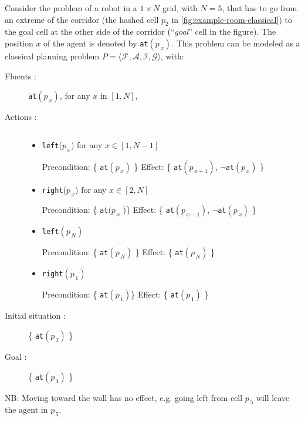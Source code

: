 \begin{example}
\label{ex:example-classical}
Consider the problem of a robot in a $1\times N$ grid, with
$N=5$, that has to go from an extreme of the corridor (the hashed cell $p_2$ in \autoref{fig:example-room-classical})
 to the goal cell at the other side of the corridor (``\emph{goal}'' cell in the figure). The position $x$ of the agent is
denoted by \texttt{at}$(p_{\,x})$.
%
 This problem can be modeled
as a classical planning problem $P = \langle \mathcal{F, A, I, G} \rangle$, with:
\begin{description}
 \item [Fluents \fluents:] \texttt{at}$(p_{\,x})$, %
   for any $x$ in  $[1, N]$,
\item [Actions \acts:]$ $  %
  \begin{itemize}
  \item \texttt{left}($p_{\,x}$) for any $x \in [1, N-1]$ 

    \hspace*{3mm}Precondition: \{ \texttt{at}$(p_{\,x})$ \}
    \hspace*{3mm}Effect:  \{ \texttt{at}$(p_{\,x+1})$, $\neg$\texttt{at}$(p_{\,x})$ \}
%
%
  \item \texttt{right}($p_{\,x}$) for any  $x \in [2, N]$  

    \hspace*{3mm}Precondition: \{ \texttt{at}$(p_{\,x}$ )\} 
    \hspace*{3mm}Effect:   \{ \texttt{at}$(p_{\,x-1})$, $\neg$\texttt{at}$(p_{\,x})$ \}
  \end{itemize}
  \begin{itemize}
  \item \texttt{left}$(p_{\,N})$ 

    \hspace*{3mm}Precondition: \{ \texttt{at}$(p_{\,N})$ \} 
    \hspace*{3mm}Effect:  \{ \texttt{at}$(p_{\,N})$ \}
%
  \item \texttt{right}$(p_{\,1})$  

    \hspace*{3mm}Precondition: \{ \texttt{at}$(p_{\,1})$\}  
    \hspace*{3mm}Effect:   \{ \texttt{at}$(p_{\,1})$ \}
  \end{itemize}
\item [Initial situation \init:] \{ \texttt{at}$(p_{\,2})$ \}
%
\item[Goal \goal:] \{ \texttt{at}$(p_{\,4})$ \}
%
\end{description}
NB: Moving toward the wall has no effect, e.g. going left from cell $p_{\,5}$ will leave the agent in $p_{\,5}$.


\end{example}
